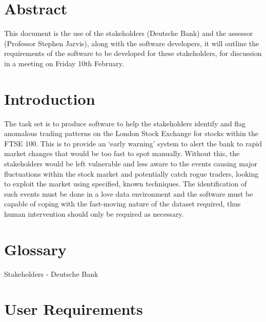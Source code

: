 \documentclass[11pt, oneside, a4paper]{article}
\begin{document}
\clearpage
\maketitle

\newpage
\setcounter{page}{1}

\section{Abstract}
This document is the use of the stakeholders (Deutsche Bank) and the assessor (Professor Stephen Jarvis),
along with the software developers, it will outline the requirements of the software to be developed for
these stakeholders, for discussion in a meeting on Friday 10th February.

\section{Introduction}
The task set is to produce software to help the stakeholders identify and flag anomalous trading patterns
on the London Stock Exchange for stocks within the FTSE 100. This is to provide an ‘early warning’ system
to alert the bank to rapid market changes that would be too fast to spot manually. Without this, the
stakeholders would be left vulnerable and less aware to the events causing major fluctuations within the
stock market and potentially catch rogue traders, looking to exploit the market using specified, known
techniques. The identification of such events must be done in a love data environment and the software
must be capable of coping with the fast-moving nature of the dataset required, thus human intervention
should only be required as necessary.

\section{Glossary}
Stakeholders - Deutsche Bank

\section{User Requirements}
\end{document}
